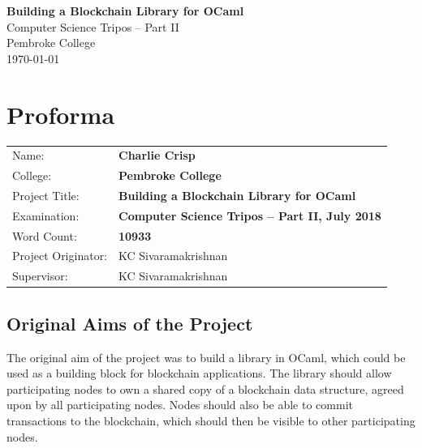 \documentclass[12pt,a4paper,twoside,openright]{report}
\begin{document}
	\pagestyle{empty}
	
	
	\vspace*{60mm}
	\begin{center}
	\Huge
	\textbf{Building a Blockchain Library for OCaml} \\[5mm]
	Computer Science Tripos -- Part II \\[5mm]
	Pembroke College \\[5mm]
	\today  %
	\end{center}
	
	
	\pagestyle{plain}
	
	\chapter*{Proforma}
	
	{\large
	\begin{tabular}{ll}
	Name:               & \bf Charlie Crisp                       \\
	College:            & \bf Pembroke College                     \\
	Project Title:      & \bf Building a Blockchain Library for OCaml \\
	Examination:        & \bf Computer Science Tripos -- Part II, July 2018  \\
	Word Count:         & \bf 10933\\
	Project Originator: & KC Sivaramakrishnan                    \\
	Supervisor:         & KC Sivaramakrishnan                    
	\end{tabular}
	}
	
	
	\section*{Original Aims of the Project}
	
	The original aim of the project was to build a library in OCaml, which could be used as a building block for blockchain applications. 
	The library should allow participating nodes to own a shared copy of a blockchain data structure, agreed upon by all participating nodes.
	Nodes should also be able to commit transactions to the blockchain, which should then be visible to other participating nodes. 
	
\end{document}
